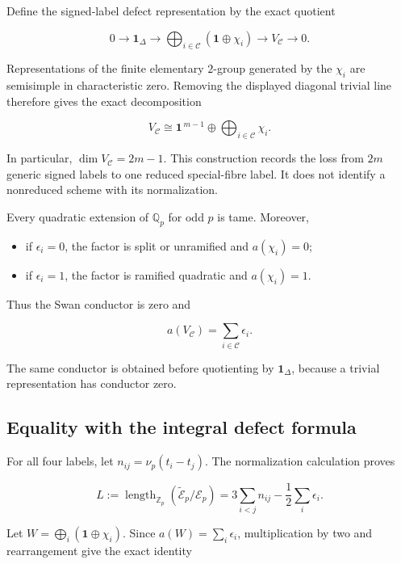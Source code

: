 Define the signed-label defect representation by the exact quotient

\[
0\longrightarrow\mathbf1_\Delta
\longrightarrow\bigoplus_{i\in\mathcal C}
(\mathbf1\oplus\chi_i)
\longrightarrow V_{\mathcal C}
\longrightarrow0.
\]

Representations of the finite elementary \(2\)-group generated by the
\(\chi_i\) are semisimple in characteristic zero. Removing the displayed
diagonal trivial line therefore gives the exact decomposition

\[
\boxed{
V_{\mathcal C}\cong
\mathbf1^{\,m-1}\oplus
\bigoplus_{i\in\mathcal C}\chi_i.
}
\tag{LG1}
\]

In particular, \(\dim V_{\mathcal C}=2m-1\). This construction records
the loss from \(2m\) generic signed labels to one reduced special-fibre
label. It does not identify a nonreduced scheme with its normalization.

Every quadratic extension of \(\mathbb Q_p\) for odd \(p\) is tame.
Moreover,

\begin{itemize}
\tightlist
\item
  if \(\epsilon_i=0\), the factor is split or unramified and
  \(a(\chi_i)=0\);
\item
  if \(\epsilon_i=1\), the factor is ramified quadratic and
  \(a(\chi_i)=1\).
\end{itemize}

Thus the Swan conductor is zero and

\[
\boxed{
a(V_{\mathcal C})=\sum_{i\in\mathcal C}\epsilon_i.
}
\tag{LG2}
\]

The same conductor is obtained before quotienting by
\(\mathbf1_\Delta\), because a trivial representation has conductor
zero.

\subsection{Equality with the integral defect
formula}\label{equality-with-the-integral-defect-formula}

For all four labels, let \(n_{ij}=\nu_p(t_i-t_j)\). The normalization
calculation proves

\[
L:=
\operatorname{length}_{\mathbb Z_p}
(\widetilde{\mathscr E}_p/\mathscr E_p)
=
3\sum_{i<j}n_{ij}-\frac12\sum_i\epsilon_i.
\]

Let \(W=\bigoplus_i(\mathbf1\oplus\chi_i)\). Since
\(a(W)=\sum_i\epsilon_i\), multiplication by two and rearrangement give
the exact identity

